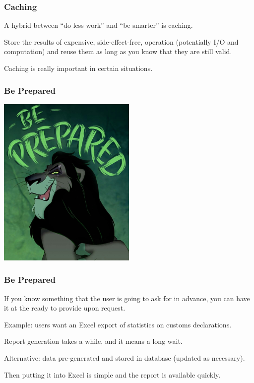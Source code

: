 \begin{frame}
\frametitle{Caching}

A hybrid between ``do less work'' and ``be smarter'' is caching. 

Store the results of expensive, side-effect-free, operation
(potentially I/O and computation) and reuse them as long as you
know that they are still valid. 

Caching is really important in certain situations.


\end{frame}



\begin{frame}
\frametitle{Be Prepared}

\begin{center}
	\includegraphics[width=0.5\textwidth]{images/beprepared.jpg}
\end{center}

\end{frame}


\begin{frame}
\frametitle{Be Prepared}

If you know something that the user is going to ask for in advance, you can have it at the ready to provide upon request. 

Example: users want an Excel export of statistics on customs declarations. 

Report generation takes a while, and it means a long wait. 

Alternative: data pre-generated and stored in database (updated as necessary).

Then putting it into Excel is simple and the report is available quickly.


\end{frame}




